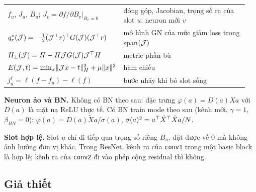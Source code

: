 \begin{longtable}{@{}p{0.27\linewidth}p{0.68\linewidth}@{}}
$f_u$, $J_u$, $B_u$; $J_v=\partial f/\partial B_v|_{B_v=0}$ & đóng góp, Jacobian, trọng số ra của slot $u$; neuron mới $v$ \\
$q^*_r(\mathcal{J})=-\tfrac12(\mathcal{J}^{\top} r)^{\top} G(\mathcal{J})(\mathcal{J}^{\top} r)$ & mô hình GN của mức giảm loss trong span$(\mathcal{J})$ \\
$H_\perp(\mathcal{J})=H-H\mathcal{J} G(\mathcal{J})\mathcal{J}^{\top} H$ & metric phần bù \\
$E(\mathcal{J},t)=\min_x\lVert \mathcal{J} x-t\rVert_H^2+\mu\lVert x\rVert^2$ & hàm chiếu \\
$j_u^\ell=\ell(f-f_u)-\ell(f)$ & bước nhảy khi bỏ slot sống \\
\bottomrule
\end{longtable}

\textbf{Neuron ảo và BN.} Không có BN theo sau: đặc trưng $\varphi(a)=D(a)Xa$ với $D(a)$ là mặt nạ ReLU thực tế. Có BN train mode theo sau (kênh mới, $\gamma=1$, $\beta_{BN}=0$): $\varphi(a)=D(a)\tilde Xa/\sigma(a)$, $\sigma(a)^2=a^{\top}\tilde X^{\top}\tilde Xa/N$.

\textbf{Slot hợp lệ.} Slot $u$ chỉ đi tiếp qua trọng số riêng $B_u$, đặt được về $0$ mà không ảnh hưởng đơn vị khác. Trong ResNet, kênh ra của \texttt{conv1} trong một basic block là hợp lệ; kênh ra của \texttt{conv2} đi vào phép cộng residual thì không.

\subsection{Giả thiết}\label{sec:assumptions}


